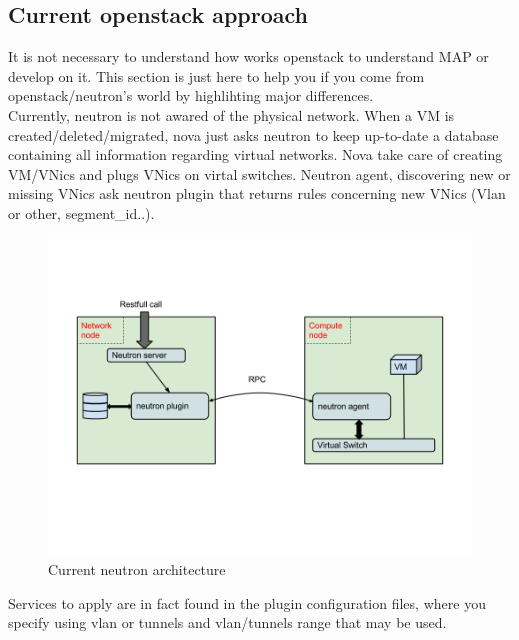\subsection{Current openstack approach}
It is not necessary to understand how works openstack to understand MAP or
develop on it. This section is just here to help you if you come from
openstack/neutron's world by highlihting major differences.\\
Currently, neutron is not awared of the physical network. When a VM is
created/deleted/migrated, nova just asks neutron to keep
up-to-date a database
containing all information regarding virtual networks. Nova take care of
creating VM/VNics and plugs VNics on virtal switches. Neutron agent,
discovering new or missing VNics ask neutron plugin that returns rules
concerning new VNics (Vlan or other, segment\_id..).
\begin{figure}
    \begin{center}
        \includegraphics[width=400pt]{img/old_neutron.png}
        \caption{Current neutron architecture}
    \end{center}
\end{figure}
Services to apply are in fact found in the plugin configuration files, where
you specify using vlan or tunnels and vlan/tunnels range that may be used.

